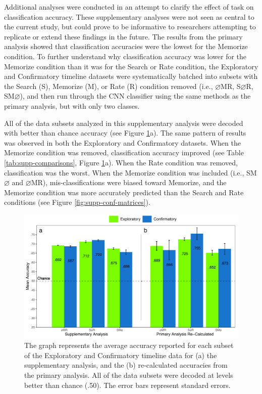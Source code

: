\documentclass[
  english,
  man, donotrepeattitle,floatsintext]{apa6}
\begin{document}
Additional analyses were conducted in an attempt to clarify the effect of task on classification accuracy. These supplementary analyses were not seen as central to the current study, but could prove to be informative to researchers attempting to replicate or extend these findings in the future. The results from the primary analysis showed that classification accuracies were the lowest for the Memorize condition. To further understand why classification accuracy was lower for the Memorize condition than it was for the Search or Rate condition, the Exploratory and Confirmatory timeline datasets were systematically batched into subsets with the Search (S), Memorize (M), or Rate (R) condition removed (i.e., \(\varnothing\)MR, S\(\varnothing\)R, SM\(\varnothing\)), and then run through the CNN classifier using the same methods as the primary analysis, but with only two classes.

All of the data subsets analyzed in this supplementary analysis were decoded with better than chance accuracy (see Figure \ref{fig:supp-chance}a). The same pattern of results was observed in both the Exploratory and Confirmatory datasets. When the Memorize condition was removed, classification accuracy improved (see Table \ref{tab:supp-comparisons}, Figure \ref{fig:supp-chance}a). When the Rate condition was removed, classification was the worst. When the Memorize condition was included (i.e., SM\(\varnothing\) and \(\varnothing\)MR), mis-classifications were biased toward Memorize, and the Memorize condition was more accurately predicted than the Search and Rate conditions (see Figure \ref{fig:supp-conf-matrices}).

\begin{figure}
\centering
\includegraphics{figures/supp_analysis/supp_subset_chance.pdf}
\caption{\label{fig:supp-chance}The graph represents the average accuracy reported for each subset of the Exploratory and Confirmatory timeline data for (a) the supplementary analysis, and the (b) re-calculated accuracies from the primary analysis. All of the data subsets were decoded at levels better than chance (.50). The error bars represent standard errors.}
\end{figure}
\end{document}
